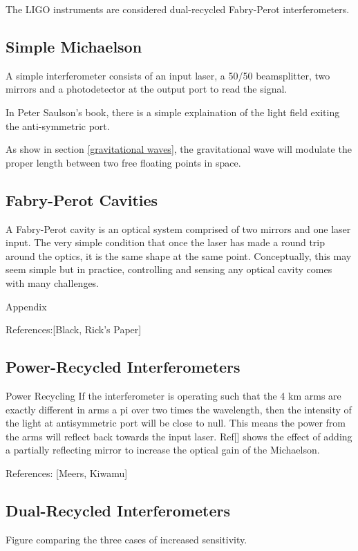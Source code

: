 \documentclass[oneside]{book}
\begin{document}
	The LIGO instruments are considered dual-recycled Fabry-Perot interferometers.
	
		\subsection{Simple Michaelson}
		A simple interferometer consists of an input laser, a 50/50 beamsplitter, two mirrors and a photodetector at the output port to read the signal.
		
		In Peter Saulson's book, there is a simple explaination of the light field exiting the anti-symmetric port.
		
		
		As show in section \ref{gravitational waves}, the gravitational wave will modulate the proper length between two free floating points in space. 
	
		\subsection{Fabry-Perot Cavities}\label{FP}
		A Fabry-Perot cavity is an optical system comprised of two mirrors and one laser input. The very simple condition that once the laser has made a round trip around the optics, it is the same shape at the same point.  Conceptually, this may seem simple but in practice, controlling and sensing any optical cavity comes with many challenges.

		Appendix

		References:[Black, Rick's Paper]

		\subsection{Power-Recycled Interferometers}
		Power Recycling
		If the interferometer is operating such that the 4 km arms are exactly different in arms a pi over two times the wavelength, then the intensity of the light at antisymmetric port will be close to null.  This means the power from the arms will reflect back towards the input laser.  Ref[] shows the effect of adding a partially reflecting mirror to increase the optical gain of the Michaelson.
		
		References: [Meers, Kiwamu]
		
		\subsection{Dual-Recycled Interferometers}
		
		
		Figure comparing the three cases of increased sensitivity.
		
\end{document}
